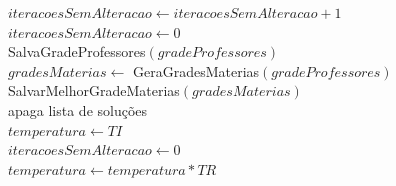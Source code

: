\begin{algorithm}
{{			$iteracoesSemAlteracao \leftarrow iteracoesSemAlteracao + 1$\\
		}{
			$iteracoesSemAlteracao \leftarrow 0$\\
		}
		 {
			 {
				SalvaGradeProfessores$(gradeProfessores)$\\
				$gradesMaterias \leftarrow$ GeraGradesMaterias$(gradeProfessores)$\\
				SalvarMelhorGradeMaterias$(gradesMaterias)$\\
			}
			apaga lista de soluções\\
			$temperatura \leftarrow TI$\\
			$iteracoesSemAlteracao \leftarrow 0$\\
		}
		$temperatura \leftarrow temperatura * TR$
	}
\end{algorithm}

